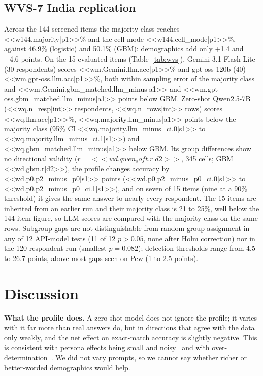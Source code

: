 \documentclass[conference]{IEEEtran}
\begin{document}
\subsection{WVS-7 India replication}

Across the 144 screened items the majority class reaches <<w144.majority|p1>>\% and the cell mode <<w144.cell_mode|p1>>\%, against 46.9\% (logistic) and 50.1\% (GBM): demographics add only +1.4 and +4.6 points. On the 15 evaluated items (Table~\ref{tab:wvs}), Gemini 3.1 Flash Lite (30 respondents) scores <<wm.Gemini.llm.acc|p1>>\% and gpt-oss-120b (40) <<wm.gpt-oss.llm.acc|p1>>\%, both within sampling error of the majority class and <<wm.Gemini.gbm_matched.llm_minus|a1>> and <<wm.gpt-oss.gbm_matched.llm_minus|a1>> points below GBM. Zero-shot Qwen2.5-7B (<<wq.n_resp|int>> respondents, <<wq.n_rows|int>> rows) scores <<wq.llm.acc|p1>>\%, <<wq.majority.llm_minus|a1>> points below the majority class (95\% CI <<wq.majority.llm_minus_ci.0|s1>> to <<wq.majority.llm_minus_ci.1|s1>>) and <<wq.gbm_matched.llm_minus|a1>> below GBM. Its group differences show no directional validity ($r={<<wd.qwen_soft.r|d2>>}$, 345 cells; GBM <<wd.gbm.r|d2>>), the profile changes accuracy by <<wd.p0.p2_minus_p0|s1>> points (<<wd.p0.p2_minus_p0_ci.0|s1>> to <<wd.p0.p2_minus_p0_ci.1|s1>>), and on seven of 15 items (nine at a 90\% threshold) it gives the same answer to nearly every respondent. The 15 items are inherited from an earlier run and their majority class is 21 to 25\%, well below the 144-item figure, so LLM scores are compared with the majority class on the same rows. Subgroup gaps are not distinguishable from random group assignment in any of 12 API-model tests (11 of 12 $p>0.05$, none after Holm correction) nor in the 120-respondent run (smallest $p=0.082$); detection thresholds range from 4.5 to 26.7 points, above most gaps seen on Pew (1 to 2.5 points).

\begin{table}[!t]
\caption{WVS-7 India, 15 items: zero-shot LLM accuracy against baselines on the same rows (95\% respondent-bootstrap CIs).}
\label{tab:wvs}
\centering
\scriptsize

\end{table}

\section{Discussion}

\textbf{What the profile does.} A zero-shot model does not ignore the profile; it varies with it far more than real answers do, but in directions that agree with the data only weakly, and the net effect on exact-match accuracy is slightly negative. This is consistent with persona effects being small and noisy~\cite{hu2024} and with over-determination~\cite{chen2026}. We did not vary prompts, so we cannot say whether richer or better-worded demographics would help.
\end{document}
